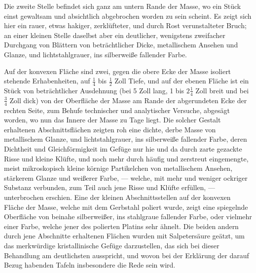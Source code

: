 \documentclass[a4paper, 11pt, oneside, german]{article}
\begin{document}
Die zweite Stelle befindet sich ganz am untern Rande der Masse, wo ein Stück einst gewaltsam und absichtlich abgebrochen worden zu sein scheint. Es zeigt sich hier ein rauer, etwas hakiger, zerklüfteter, und durch Rost verunstalteter Bruch; an einer kleinen Stelle daselbst aber ein deutlicher, wenigstens zweifacher Durchgang von Blättern von beträchtlicher Dicke, metallischem Ansehen und Glanze, und lichtstahlgrauer, ins silberweiße fallender Farbe.

Auf der konvexen Fläche sind zwei, gegen die obere Ecke der Masse isoliert stehende Erhabenheiten, auf $\frac{1}{4}$ bis $\frac{1}{2}$ Zoll Tiefe, und auf der ebenen Fläche ist ein Stück von beträchtlicher Ausdehnung (bei 5 Zoll lang, 1 bis $2\frac{1}{4}$ Zoll breit und bei $\frac{3}{4}$ Zoll dick) von der Oberfläche der Masse am Rande der abgerundeten Ecke der rechten Seite, zum Behufe technischer und analytischer Versuche, abgesägt worden, wo nun das Innere der Masse zu Tage liegt. Die solcher Gestalt erhaltenen Abschnittsflächen zeigten roh eine dichte, derbe Masse von metallischem Glanze, und lichtstahlgrauer, ins silberweiße fallender Farbe, deren Dichtheit und Gleichförmigkeit im Gefüge nur hie und da durch zarte gezackte Risse und kleine Klüfte, und noch mehr durch häufig und zerstreut eingemengte, meist mikroskopisch kleine körnige Partikelchen von metallischem Ansehen, stärkerem Glanze und weißerer Farbe, --- welche, mit mehr und weniger ockriger Substanz verbunden, zum Teil auch jene Risse und Klüfte erfüllen, --- unterbrochen erschien. Eine der kleinen Abschnittsstellen auf der konvexen Fläche der Masse, welche mit dem Gerbstahl poliert wurde, zeigt eine spiegelnde Oberfläche von beinahe silberweißer, ins stahlgraue fallender Farbe, oder vielmehr einer Farbe, welche jener des polierten Platins sehr ähnelt. Die beiden andern durch jene Abschnitte erhaltenen Flächen wurden mit Salpetersäure geätzt, um das merkwürdige kristallinische Gefüge darzustellen, das sich bei dieser Behandlung am deutlichsten ausspricht, und wovon bei der Erklärung der darauf Bezug habenden Tafeln insbesondere die Rede sein wird.
\end{document}
